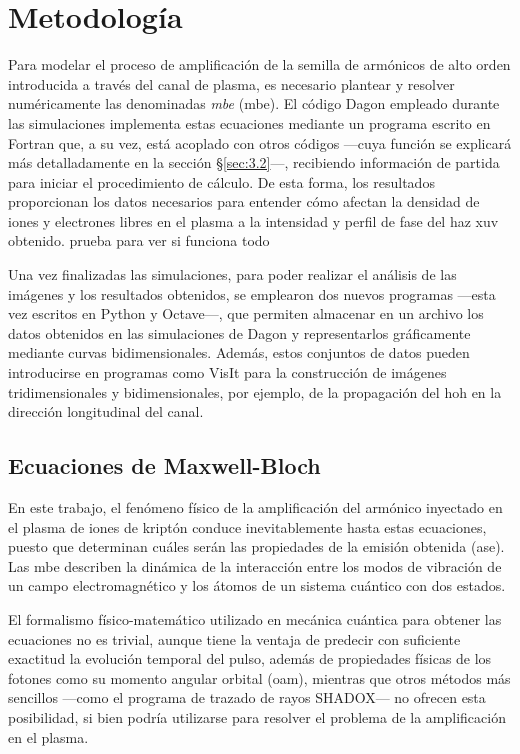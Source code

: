 \chapter{Metodología}\label{cap:3}
Para modelar el proceso de amplificación de la semilla de armónicos de alto orden introducida a través del canal de plasma, es necesario plantear y resolver numéricamente las denominadas \emph{\acrlong{mbe}} (\acrshort{mbe}). El código Dagon empleado durante las simulaciones implementa estas ecuaciones mediante un programa escrito en Fortran que, a su vez, está acoplado con otros códigos ---cuya función se explicará más detalladamente en la sección \S\ref{sec:3.2}---, recibiendo información de partida para iniciar el procedimiento de cálculo. De esta forma, los resultados proporcionan los datos necesarios para entender cómo afectan la densidad de iones y electrones libres en el plasma a la intensidad y perfil de fase del haz \acrshort{xuv} obtenido. prueba para ver si funciona todo

Una vez finalizadas las simulaciones, para poder realizar el análisis de las imágenes y los resultados obtenidos, se emplearon dos nuevos programas ---esta vez escritos en Python y Octave---, que permiten almacenar en un archivo los datos obtenidos en las simulaciones de Dagon y representarlos gráficamente mediante curvas bidimensionales. Además, estos conjuntos de datos pueden introducirse en programas como VisIt para la construcción de imágenes tridimensionales y bidimensionales, por ejemplo, de la propagación del \acrshort{hoh} en la dirección longitudinal del canal.

\section{Ecuaciones de Maxwell-Bloch}\label{sec:3.1}
En este trabajo, el fenómeno físico de la amplificación del armónico inyectado en el plasma de iones de kriptón conduce inevitablemente hasta estas ecuaciones, puesto que determinan cuáles serán las propiedades de la emisión obtenida (\acrshort{ase}). Las \acrshort{mbe} describen la dinámica de la interacción entre los modos de vibración de un campo electromagnético y los átomos de un sistema cuántico con dos estados. 

El formalismo físico-matemático utilizado en mecánica cuántica para obtener las ecuaciones no es trivial\autocite{Cohen-Tannoudji2019QuantumApplications,Cohen-Tannoudji2019QuantumMethods,Sakurai2020ModernMechanics,Milonni1988Lasers}, aunque tiene la ventaja de predecir con suficiente exactitud la evolución temporal del pulso, además de propiedades físicas de los fotones como su momento angular orbital (\acrshort{oam}), mientras que otros métodos más sencillos ---como el programa de trazado de rayos SHADOX--- no ofrecen esta posibilidad, si bien podría utilizarse para resolver el problema de la amplificación en el plasma.

